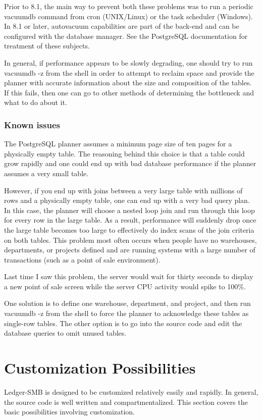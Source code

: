 \documentclass{article}
\begin{document}
Prior to 8.1, the main way to prevent both these problems was to run a periodic
vacuumdb command from cron (UNIX/Linux) or the task scheduler (Windows).  In
8.1 or later, autovacuum capabilities are part of the back-end and can be
configured with the database manager.  See the PostgreSQL documentation for
treatment of these subjects.

In general, if performance appears to be slowly degrading, one should try to run
vacuumdb -z from the shell in order to attempt to reclaim space and
provide the planner with accurate information about the size and composition of
the tables.  If this fails, then one can go to other methods of determining the
bottleneck and what to do about it.

\subsubsection{Known issues}
The PostgreSQL planner assumes a minimum page size of ten pages for a physically
empty table.  The reasoning behind this choice is that a table could grow
rapidly and one could end up with bad database performance if the planner
assumes a very small table.

However, if you end up with joins between a very large table with millions of
rows and a physically empty table, one can end up with a very bad query plan.
In this case, the planner will choose a nested loop join and run through this
loop for every row in the large table.  As a result, performance will suddenly
drop once the large table becomes too large to effectively do index scans of the
join criteria on both tables.  This problem most often occurs when people have
no warehouses, departments, or projects defined and are running systems with a
large number of transactions (such as a point of sale environment).

Last time I saw this problem, the server would wait for thirty seconds to
display a new point of sale screen while the server CPU activity would spike to
100\%.

One solution is to define one warehouse, department, and project, and then run
vacuumdb -z from the shell to force the planner to acknowledge these tables as
single-row tables.  The other option is to go into the source code and edit the
database queries to omit unused tables.

\section{Customization Possibilities}
Ledger-SMB is designed to be customized relatively easily and rapidly.  In
general, the source code is well written and compartmentalized.  This section
covers the basic possibilities involving customization. 
\end{document}
